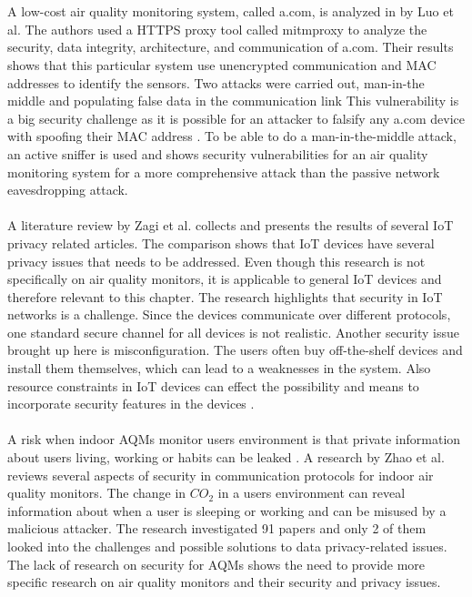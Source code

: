 \\\\
A low-cost air quality monitoring system, called a.com, is analyzed in \cite{SecurityAndDataIntInAQM} by Luo et al. The authors used a HTTPS proxy tool called mitmproxy to analyze the security, data integrity, architecture, and communication of a.com. Their results shows that this particular system use unencrypted communication and MAC addresses to identify the sensors. Two attacks were carried out, man-in-the middle and populating false data in the communication link This vulnerability is a big security challenge as it is possible for an attacker to falsify any a.com device with spoofing their MAC address \cite{SecurityAndDataIntInAQM}. To be able to do a man-in-the-middle attack, an active sniffer is used and shows security vulnerabilities for an air quality monitoring system for a more comprehensive attack than the passive network eavesdropping attack. 
\\\\
A literature review by Zagi et al. \cite{PrivacyOnGeneralIoT} collects and presents the results of several IoT privacy related articles. The comparison shows that IoT devices have several privacy issues that needs to be addressed. Even though this research is not specifically on air quality monitors, it is applicable to general IoT devices and therefore relevant to this chapter. The research highlights that security in IoT networks is a challenge. Since the devices communicate over different protocols, one standard secure channel for all devices is not realistic. Another security issue brought up here is misconfiguration. The users often buy off-the-shelf devices and install them themselves, which can lead to a weaknesses in the system. Also resource constraints in IoT devices can effect the possibility and means to incorporate security features in the devices \cite{PrivacyOnGeneralIoT}. 
\\\\
A risk when indoor AQMs monitor users environment is that private information about users living, working or habits can be leaked \cite{IAQMonitorCommunicationReview}. A research by Zhao et al. \cite{IAQMonitorCommunicationReview} reviews several aspects of security in communication protocols for indoor air quality monitors. The change in \(CO_2\) in a users environment can reveal information about when a user is sleeping or working and can be misused by a malicious attacker. The research investigated 91 papers and only 2 of them looked into the challenges and possible solutions to data privacy-related issues. The lack of research on security for AQMs shows the need to provide more specific research on air quality monitors and their security and privacy issues. 

